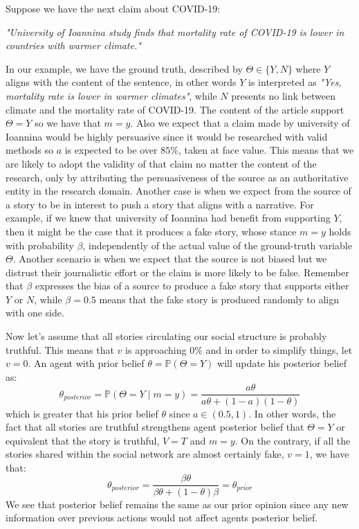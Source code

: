 Suppose we have the next claim about COVID-19:

\textit{"University of Ioannina study finds that mortality rate of COVID-19 is lower in countries with warmer climate."}

In our example, we have the ground truth, described by $\Theta \in \{Y,N\}$ where $Y$ aligns with the content of the sentence, in other words $Y$ is interpreted as \textit{"Yes, mortality rate is lower in warmer climates"}, while $N$ presents no link between climate and the mortality rate of COVID-19. The content of the article support $\Theta = Y$ so we have that $m=y$. Also we expect that a claim made by university of Ioannina would be highly persuasive since it would be researched with valid methods so $a$ is expected to be over $85\%$, taken at face value. This means that we are likely to adopt the validity of that claim no matter the content of the research, only by attributing the persuasiveness of the source as an authoritative entity in the research domain. Another case is when we expect from the source of a story to be in interest to push a story that aligns with a narrative. For example, if we knew that university of Ioannina had benefit from supporting $Y$, then it might be the case that it produces a fake story, whose stance $m=y$ holds with probability $\beta$, independently of the actual value of the ground-truth variable $\Theta$. Another scenario is when we expect that the source is not biased but we distrust their journalistic effort or the claim is more likely to be false. Remember that $\beta$ expresses the bias of a source to produce a fake story that supports either $Y$ or $N$, while $\beta = 0.5 $ means that the fake story is produced randomly to align with one side.

Now let's assume that all stories circulating our social structure is probably truthful. This means that $v$ is approaching $0\%$ and in order to simplify things, let $v=0$. An agent with prior belief $\theta = \mathbb{P} (\Theta = Y)$ will update his posterior belief as:
$$\theta_{posterior} =  \mathbb{P} (\Theta = Y \mid m=y ) = \frac{a \theta}{a \theta +(1-a)(1-\theta)}$$
which is greater that his prior belief $\theta$ since $a \in (0.5,1)$. In other words, the fact that all stories are truthful strengthens agent posterior belief that $\Theta = Y$ or equivalent that the story is truthful, $V=T$ and $m=y$. On the contrary, if all the stories shared within the social network are almost certainly fake, $v=1$, we have that:
$$\theta_{posterior} = \frac{\beta \theta}{\beta \theta +(1-\theta)\beta}=\theta_{prior}$$
We see that posterior belief remains the same as our prior opinion since any new information over previous actions would not affect agents  posterior belief. 

